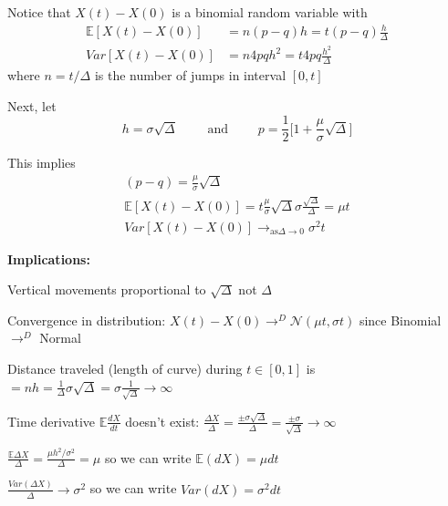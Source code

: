 \documentclass[11pt, aspectratio=169]{beamer}
\newenvironment{witemize}{\itemize\addtolength{\itemsep}{10pt}}{\enditemize}
\begin{document}
\begin{frame}{}
\begin{witemize}
\item Notice that $X(t) - X(0)$ is a binomial random variable with 
\begin{align*}
	\mathbb E[X(t) - X(0)] &= n(p - q) h = t(p-q) \frac{h}{\Delta} \\
	Var[X(t) - X(0)] &= n 4 pq h^2 = t 4 pq \frac{h^2}{\Delta}
\end{align*}
where $n = t / \Delta$ is the number of jumps in interval $[0, t]$

\item Next, let 
\begin{equation*}
	h = \sigma \sqrt{\Delta} 
	\quad \quad \text{ and } \quad\quad
	p = \frac{1}{2} \Big[ 1 + \frac{\mu}{\sigma} \sqrt{\Delta} \Big]
\end{equation*}

\item This implies
\begin{gather*}
(p-q) = \frac{\mu}{\sigma} \sqrt{\Delta} \\
	\mathbb E[X(t) - X(0)] = t \frac{\mu}{\sigma} \sqrt{\Delta} \sigma \frac{\sqrt{\Delta}}{\Delta} = \mu t \\
	Var[X(t) - X(0)] \longrightarrow_{\text{as} \Delta \to 0} \sigma^2 t
\end{gather*}

\end{witemize}
\end{frame}


\begin{frame}{}
\textbf{Implications:}
\begin{witemize}
	\item Vertical movements proportional to $\sqrt{\Delta}$ not $\Delta$

	\item Convergence in distribution: $X(t) - X(0) \to^D \mathcal N(\mu t, \sigma t)$ since Binomial $\to^D$ Normal
		
	\item Distance traveled (length of curve) during $t \in [0, 1]$ is $= nh = \frac{1}{\Delta} \sigma \sqrt \Delta = \sigma \frac{1}{\sqrt \Delta} \to \infty$

	\item Time derivative $\mathbb E \frac{dX}{dt}$ doesn't exist: $\frac{\Delta X}{\Delta} = \frac{\pm \sigma \sqrt \Delta}{\Delta} = \frac{\pm \sigma}{\sqrt \Delta} \to \infty$

	\item $\frac{\mathbb E \Delta X}{\Delta} = \frac{\mu h^2 / \sigma^2}{\Delta} = \mu$ so we can write $\mathbb E(dX) = \mu dt$

	\item $\frac{Var(\Delta X)}{\Delta} \to \sigma^2$ so we can write $Var(dX) = \sigma^2 dt$
\end{witemize}
\end{frame}
\end{document}
